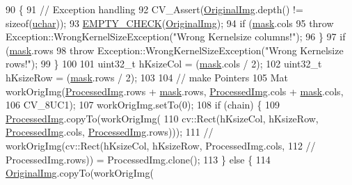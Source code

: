 \begin{DoxyCode}
90                                                                 \{
91   \textcolor{comment}{// Exception handling}
92   CV\_Assert(\hyperlink{class_vision_1_1_image_processing_a77c370dab270158a4e9c634e2d3f48e7}{OriginalImg}.depth() != \textcolor{keyword}{sizeof}(\hyperlink{_soil_math_types_8h_a65f85814a8290f9797005d3b28e7e5fc}{uchar}));
93   \hyperlink{_image_processing_8h_a27c4e53b88a0f9f2c097add555131056}{EMPTY\_CHECK}(\hyperlink{class_vision_1_1_image_processing_a77c370dab270158a4e9c634e2d3f48e7}{OriginalImg});
94   \textcolor{keywordflow}{if} (\hyperlink{_gen_blob_8m_a5d76cc2129e79ba1941d2cc2f53b9e8e}{mask}.cols %
95     \textcolor{keywordflow}{throw} Exception::WrongKernelSizeException(\textcolor{stringliteral}{"Wrong Kernelsize columns!"});
96   \}
97   \textcolor{keywordflow}{if} (\hyperlink{_gen_blob_8m_a5d76cc2129e79ba1941d2cc2f53b9e8e}{mask}.rows %
98     \textcolor{keywordflow}{throw} Exception::WrongKernelSizeException(\textcolor{stringliteral}{"Wrong Kernelsize rows!"});
99   \}
100 
101   uint32\_t hKsizeCol = (\hyperlink{_gen_blob_8m_a5d76cc2129e79ba1941d2cc2f53b9e8e}{mask}.cols / 2);
102   uint32\_t hKsizeRow = (\hyperlink{_gen_blob_8m_a5d76cc2129e79ba1941d2cc2f53b9e8e}{mask}.rows / 2);
103 
104   \textcolor{comment}{// make Pointers}
105   Mat workOrigImg(\hyperlink{class_vision_1_1_image_processing_aa7d65742882cd1b2a1e4e9cb68809211}{ProcessedImg}.rows + \hyperlink{_gen_blob_8m_a5d76cc2129e79ba1941d2cc2f53b9e8e}{mask}.rows, \hyperlink{class_vision_1_1_image_processing_aa7d65742882cd1b2a1e4e9cb68809211}{ProcessedImg}.cols + 
      \hyperlink{_gen_blob_8m_a5d76cc2129e79ba1941d2cc2f53b9e8e}{mask}.cols,
106                   CV\_8UC1);
107   workOrigImg.setTo(0);
108   \textcolor{keywordflow}{if} (chain) \{
109     \hyperlink{class_vision_1_1_image_processing_aa7d65742882cd1b2a1e4e9cb68809211}{ProcessedImg}.copyTo(workOrigImg(
110         cv::Rect(hKsizeCol, hKsizeRow, \hyperlink{class_vision_1_1_image_processing_aa7d65742882cd1b2a1e4e9cb68809211}{ProcessedImg}.cols, 
      \hyperlink{class_vision_1_1_image_processing_aa7d65742882cd1b2a1e4e9cb68809211}{ProcessedImg}.rows)));
111     \textcolor{comment}{// workOrigImg(cv::Rect(hKsizeCol, hKsizeRow, ProcessedImg.cols,}
112     \textcolor{comment}{// ProcessedImg.rows)) = ProcessedImg.clone();}
113   \} \textcolor{keywordflow}{else} \{
114     \hyperlink{class_vision_1_1_image_processing_a77c370dab270158a4e9c634e2d3f48e7}{OriginalImg}.copyTo(workOrigImg(

\end{DoxyCode}
